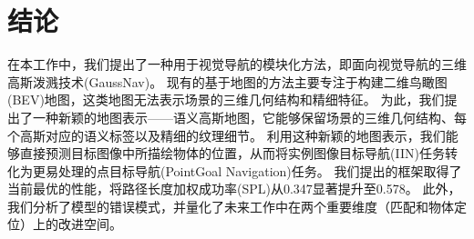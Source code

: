 \section{结论}

在本工作中，我们提出了一种用于视觉导航的模块化方法，即面向视觉导航的三维高斯泼溅技术(GaussNav)。
现有的基于地图的方法主要专注于构建二维鸟瞰图(BEV)地图，这类地图无法表示场景的三维几何结构和精细特征。
为此，我们提出了一种新颖的地图表示——语义高斯地图，它能够保留场景的三维几何结构、每个高斯对应的语义标签以及精细的纹理细节。
利用这种新颖的地图表示，我们能够直接预测目标图像中所描绘物体的位置，从而将实例图像目标导航(IIN)任务转化为更易处理的点目标导航(PointGoal Navigation)任务。
我们提出的框架取得了当前最优的性能，将路径长度加权成功率(SPL)从0.347显著提升至0.578。
此外，我们分析了模型的错误模式，并量化了未来工作中在两个重要维度（匹配和物体定位）上的改进空间。